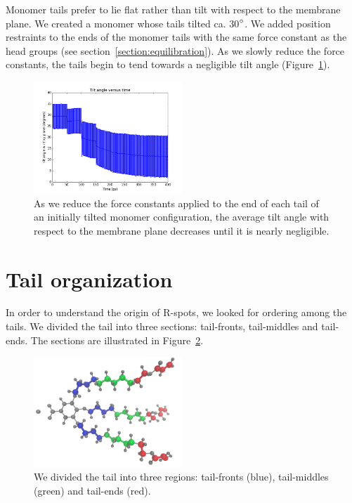 \documentclass{article}
\begin{document}
  Monomer tails prefer to lie flat rather than tilt with respect to the
  membrane plane. We created a monomer whose tails tilted ca. 30$\degree$. 
  We added position restraints to the ends of the monomer tails with the
  same force constant as the head groups (see section~\ref{section:equilibration}).
  As we slowly reduce the force constants, the tails begin to tend towards
  a negligible tilt angle (Figure~\ref{fig:tail_tilt}).
  
  \begin{figure}[!htb]
  \centering
  \includegraphics[width=0.5\textwidth]{tilt_cat.png}
  \caption{As we reduce the force constants applied to the end of each
  tail of an initially tilted monomer configuration, the average tilt 
  angle with respect to the membrane plane decreases until it is nearly
  negligible.}\label{fig:tail_tilt}
  \end{figure}

  \section{Tail organization}\label{section:tail_packing}
  
  In order to understand the origin of R-spots, we looked for ordering among
  the tails. We divided the tail into three sections: tail-fronts, tail-middles
  and tail-ends. The sections are illustrated in Figure~\ref{fig:tail_sections}.
  
  \begin{figure}[!htb]
  \centering
  \includegraphics[width=0.5\textwidth]{tail_sections.png}
  \caption{We divided the tail into three regions: tail-fronts (blue), 
  tail-middles (green) and tail-ends (red).}\label{fig:tail_sections}
  \end{figure}
  
\end{document}
